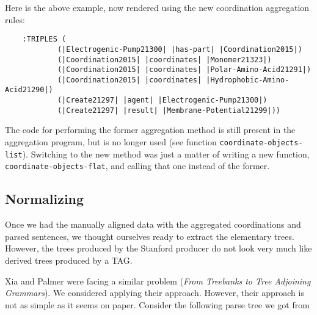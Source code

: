 \documentclass[a4paper]{article}
\begin{document}
Here is the above example, now rendered using the new coordination
aggregation rules:

\begin{verbatim}
    :TRIPLES (
            (|Electrogenic-Pump21300| |has-part| |Coordination2015|)
            (|Coordination2015| |coordinates| |Monomer21323|)
            (|Coordination2015| |coordinates| |Polar-Amino-Acid21291|)
            (|Coordination2015| |coordinates| |Hydrophobic-Amino-Acid21290|)
            (|Create21297| |agent| |Electrogenic-Pump21300|)
            (|Create21297| |result| |Membrane-Potential21299|))
\end{verbatim}

The code for performing the former aggregation method is still present
in the aggregation program, but is no longer used (see function
\texttt{coordinate-objects-list}). Switching to the new method was
just a matter of writing a new function,
\texttt{coordinate-objects-flat}, and calling that one instead of the
former.

\subsection{Normalizing}

Once we had the manually aligned data with the aggregated
coordinations and parsed sentences, we thought ourselves ready to
extract the elementary trees. However, the trees produced by the
Stanford producer do not look very much like derived trees produced by
a TAG.

Xia and Palmer were facing a similar problem (\emph{From Treebanks to
Tree Adjoining Grammars}). We considered applying their approach.
However, their approach is not as simple as it seems on paper.
Consider the following parse tree we got from 

\end{document}
